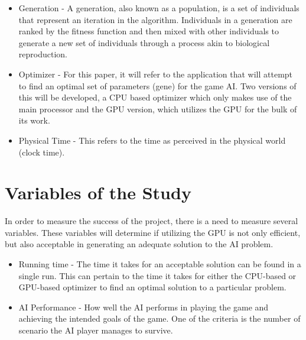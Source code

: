 \begin{itemize}
 \item Generation - A generation, also known as a population, is a set of individuals that represent
an iteration in the algorithm. Individuals in a generation are ranked by the fitness function and then
mixed with other individuals to generate a new set of individuals through a process akin to biological
reproduction.

  \item Optimizer - For this paper, it will refer to the application that will attempt to find an
optimal set of parameters (gene) for the game AI. Two versions of this will be developed, a CPU
based optimizer which only makes use of the main processor and the GPU version, which utilizes
the GPU for the bulk of its work.

  \item Physical Time - This refers to the time as perceived in the physical world
(clock time).

\end{itemize}

\section{Variables of the Study}

In order to measure the success of the project, there is a need to measure several variables. These
variables will determine if utilizing the GPU is not only efficient, but also acceptable in generating
an adequate solution to the AI problem.

\begin{itemize}
 \item Running time - The time it takes for an acceptable solution can be found in a single run.
This can pertain to the time it takes for either the CPU-based or GPU-based optimizer to find an
optimal solution to a particular problem.

 \item AI Performance - How well the AI performs in playing the game and achieving the intended goals
of the game. One of the criteria is the number of scenario the AI player manages to survive.
\end{itemize}
